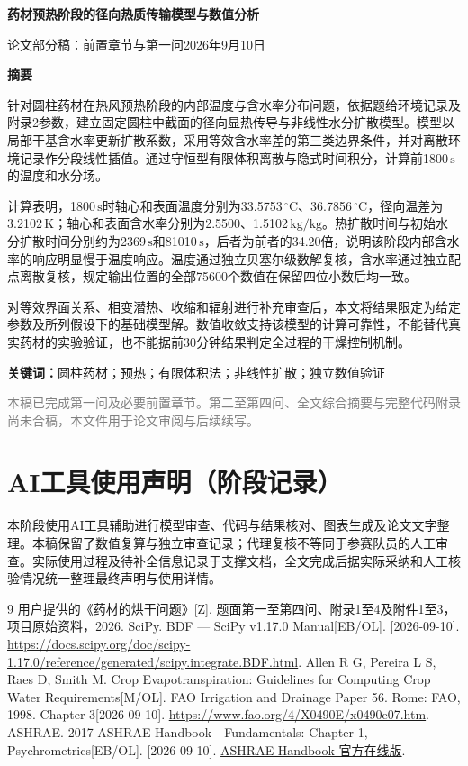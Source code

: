 \documentclass[UTF8,a4paper,zihao=-4,fontset=windows]{ctexart}
\newcommand{\unit}[1]{\ensuremath{\,\mathrm{#1}}}
\newcommand{\celsius}{\ensuremath{\,{}^\circ\mathrm{C}}}
\begin{document}
\begin{center}
{\LARGE\bfseries 药材预热阶段的径向热质传输模型与数值分析\par}
\vspace{0.8em}
{\small 论文部分稿：前置章节与第一问\quad 2026年9月10日}
\end{center}
\vspace{0.5em}
\begin{center}\large\bfseries 摘\quad 要\end{center}
针对圆柱药材在热风预热阶段的内部温度与含水率分布问题，依据题给环境记录及附录2参数，建立固定圆柱中截面的径向显热传导与非线性水分扩散模型。模型以局部干基含水率更新扩散系数，采用等效含水率差的第三类边界条件，并对离散环境记录作分段线性插值。通过守恒型有限体积离散与隐式时间积分，计算前1800\unit{s}的温度和水分场。

计算表明，1800\unit{s}时轴心和表面温度分别为33.5753\celsius、36.7856\celsius，径向温差为3.2102\unit{K}；轴心和表面含水率分别为2.5500、1.5102\unit{kg/kg}。热扩散时间与初始水分扩散时间分别约为2369\unit{s}和81010\unit{s}，后者为前者的34.20倍，说明该阶段内部含水率的响应明显慢于温度响应。温度通过独立贝塞尔级数解复核，含水率通过独立配点离散复核，规定输出位置的全部75600个数值在保留四位小数后均一致。

对等效界面关系、相变潜热、收缩和辐射进行补充审查后，本文将结果限定为给定参数及所列假设下的基础模型解。数值收敛支持该模型的计算可靠性，不能替代真实药材的实验验证，也不能据前30分钟结果判定全过程的干燥控制机制。

\vspace{0.5em}
\noindent\textbf{关键词：}圆柱药材；预热；有限体积法；非线性扩散；独立数值验证

\vfill
\noindent\small\textcolor{gray}{本稿已完成第一问及必要前置章节。第二至第四问、全文综合摘要与完整代码附录尚未合稿，本文件用于论文审阅与后续续写。}
\clearpage
\normalsize




\FloatBarrier
\section*{AI工具使用声明（阶段记录）}
本阶段使用AI工具辅助进行模型审查、代码与结果核对、图表生成及论文文字整理。本稿保留了数值复算与独立审查记录；代理复核不等同于参赛队员的人工审查。实际使用过程及待补全信息记录于支撑文档，全文完成后据实际采纳和人工核验情况统一整理最终声明与使用详情。
\begin{thebibliography}{9}
\small
{} 用户提供的《药材的烘干问题》[Z]. 题面第一至第四问、附录1至4及附件1至3，项目原始资料，2026.
 SciPy. BDF --- SciPy v1.17.0 Manual[EB/OL]. [2026-09-10]. \url{https://docs.scipy.org/doc/scipy-1.17.0/reference/generated/scipy.integrate.BDF.html}.
 Allen R G, Pereira L S, Raes D, Smith M. Crop Evapotranspiration: Guidelines for Computing Crop Water Requirements[M/OL]. FAO Irrigation and Drainage Paper 56. Rome: FAO, 1998. Chapter 3[2026-09-10]. \url{https://www.fao.org/4/X0490E/x0490e07.htm}.
 ASHRAE. 2017 ASHRAE Handbook---Fundamentals: Chapter 1, Psychrometrics[EB/OL]. [2026-09-10]. \href{https://handbook.ashrae.org/Handbooks/F17/IP/f17_ch01/f17_ch01_ip.aspx}{ASHRAE Handbook 官方在线版}.
\end{thebibliography}
\end{document}
